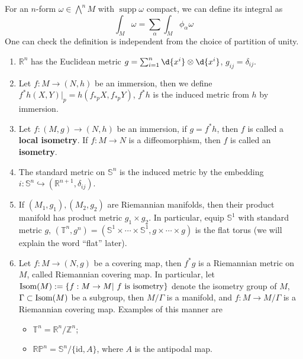 \begin{rem}
    For an $n$-form $\omega\in\bigwedge^nM$ with $\operatorname{supp}\omega$ compact, we can define its integral as
    \[\int_M\omega=\sum_\alpha\int_M\phi_\alpha\omega\]
    One can check the definition is independent from the choice of partition of unity.
\end{rem}

\begin{eg}
    \begin{enumerate}[(1)]
        \item $\mathbb{R}^n$ has the Euclidean metric $g=\sum_{i=1}^n\d{x^i}\otimes\d{x^i}$, $g_{ij}=\delta_{ij}$.
        \item Let $f:M\to(N,h)$ be an immersion, then we define $f^*h(X,Y)|_p=h(f_{*p}X,f_{*p}Y)$, $f^*h$ is the induced metric from $h$ by immersion.
        \item Let $f:(M,g)\to(N,h)$ be an immersion, if $g=f^*h$, then $f$ is called a \textbf{local isometry}.
        If $f:M\to N$ is a diffeomorphism, then $f$ is called an \textbf{isometry}.
        \item The standard metric on $\mathbb{S}^n$ is the induced metric by the embedding $i:\mathbb{S}^n\hookrightarrow(\mathbb{R}^{n+1},\delta_{ij})$.
        \item If $(M_1,g_1),(M_2,g_2)$ are Riemannian manifolds, then their product manifold has product metric $g_1\times g_2$.
        In particular, equip $\mathbb{S}^1$ with standard metric $g$, $(\mathbb{T}^n,g^n)=(\mathbb{S}^1\times\cdots\times\mathbb{S}^1,g\times\cdots\times g)$ is the flat torus (we will explain the word ``flat'' later).
        \item Let $f:M\to(N,g)$ be a covering map, then $f^*g$ is a Riemannian metric on $M$, called Riemannian covering map.
        In particular, let $\operatorname{Isom}(M):=\{f:M\to M|\ f\ \text{is isometry}\}$ denote the isometry group of $M$, $\Gamma\subset\operatorname{Isom}(M)$ be a subgroup, then $M/\Gamma$ is a manifold, and $f:M\to M/\Gamma$ is a Riemannian covering map.
        Examples of this manner are
        \begin{itemize}
            \item $\mathbb{T}^n=\mathbb{R}^n/\mathbb{Z}^n$;
            \item $\mathbb{RP}^n=\mathbb{S}^n/\{\mathrm{id},A\}$, where $A$ is the antipodal map.
        \end{itemize}
    \end{enumerate}
\end{eg}

